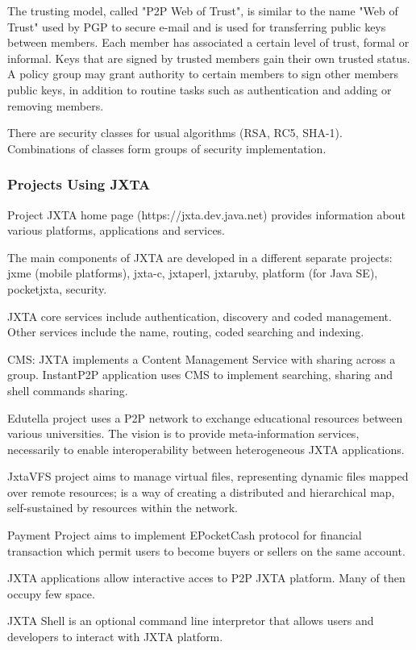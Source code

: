 The trusting model, called "P2P Web of Trust", is similar to the name "Web of
Trust" used by PGP to secure e-mail and is used for transferring public keys
between members. Each member has associated a certain level of trust, formal or
informal. Keys  that are signed by trusted members gain their own trusted
status. A policy group may grant authority to certain members to sign other
members public keys, in addition to routine tasks such as authentication and
adding or removing members.

There are security classes for usual algorithms (RSA, RC5, SHA-1). Combinations
of classes form groups of security implementation.

\subsubsection{Projects Using JXTA}

Project JXTA home page (https://jxta.dev.java.net) provides information about
various platforms, applications and services.

The main components of JXTA are developed in a different separate projects:
jxme (mobile platforms), jxta-c, jxtaperl, jxtaruby, platform (for Java SE),
pocketjxta, security.

JXTA core services include authentication, discovery and coded management.
Other services include the name, routing, coded searching and indexing.

CMS: JXTA implements a Content Management Service with sharing across a group.
InstantP2P application uses CMS to implement searching, sharing and shell
commands sharing.

Edutella project uses a P2P network to exchange educational resources between
various universities. The vision is to provide meta-information services,
necessarily to enable interoperability between heterogeneous JXTA applications.

JxtaVFS project aims to manage virtual files, representing dynamic files mapped
over remote resources; is a way of creating a distributed and hierarchical map,
self-sustained by resources within the network.

Payment Project aims to implement EPocketCash protocol for financial
transaction which permit users to become buyers or sellers on the same account.

JXTA applications allow interactive acces to P2P JXTA platform. Many of then
occupy few space.

JXTA Shell is an optional command line interpretor that allows users and
developers to interact with JXTA platform.

